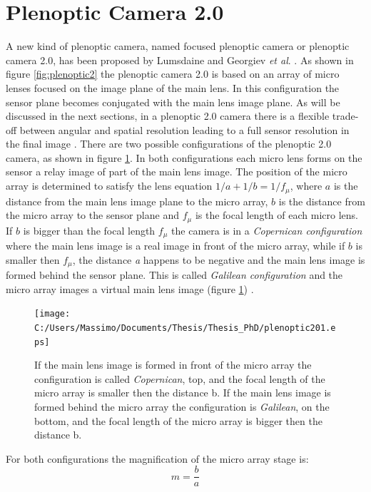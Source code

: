  \section{Plenoptic Camera 2.0}
 \label{sec:pleno20}
 A new kind of plenoptic camera, named focused plenoptic camera or plenoptic camera 2.0, has been proposed by Lumsdaine and Georgiev \textit{et al}. \cite{lumsdaine2008full,lumsdaine2009focused}. As shown in figure \ref{fig:plenoptic2} the plenoptic camera 2.0 is based on an array of micro lenses focused on the image plane of the main lens. In this configuration the sensor plane becomes conjugated with the main lens image plane. As will be discussed in the next sections, in a plenoptic 2.0 camera there is a flexible trade-off between angular and spatial resolution \cite{georgiev2010focused} leading to a full sensor resolution in the final image \cite{bishop2011full,georgiev2009resolution}. There are two possible configurations of the plenoptic 2.0 camera, as shown in figure \ref{fig:pleno201}. In both configurations each micro lens forms on the sensor a relay image of part of the main lens image. The position of the micro array is determined to satisfy the lens equation $1/a+1/b=1/f_{\mu}$, where $a$ is the distance from the main lens image plane to the micro array, $b$ is the distance from the micro array to the sensor plane and $f_{\mu}$ is the focal length of each micro lens. If $b$ is bigger than the focal length $f_{\mu}$ the camera is in a \textit{Copernican configuration} where the main lens image is a real image in front of the micro array, while if $b$ is smaller then $f_{\mu}$, the distance \textit{a} happens to be negative and the main lens image is formed behind the sensor plane. This is called \textit{Galilean configuration} and the micro array images a virtual main lens image (figure \ref{fig:pleno201}) \cite{georgiev2010focused}. 
 \begin{figure}[H]
 	\centering
 	\texttt{[image: C:/Users/Massimo/Documents/Thesis/Thesis\_PhD/plenoptic201.eps]}
 	\caption{\label{fig:pleno201} If the main lens image is formed in front of the micro array the configuration is called \textit{Copernican}, top, and the focal length of the micro array is smaller then the distance b. If the main lens image is formed behind the micro array the configuration is \textit{Galilean}, on the bottom, and the focal length of the micro array is bigger then the distance b. }
 \end{figure}
 For both configurations the magnification of the micro array stage is:
 \begin{equation}
 \label{eq:pleno20}
 m=\dfrac{b}{a}
 \end{equation}
